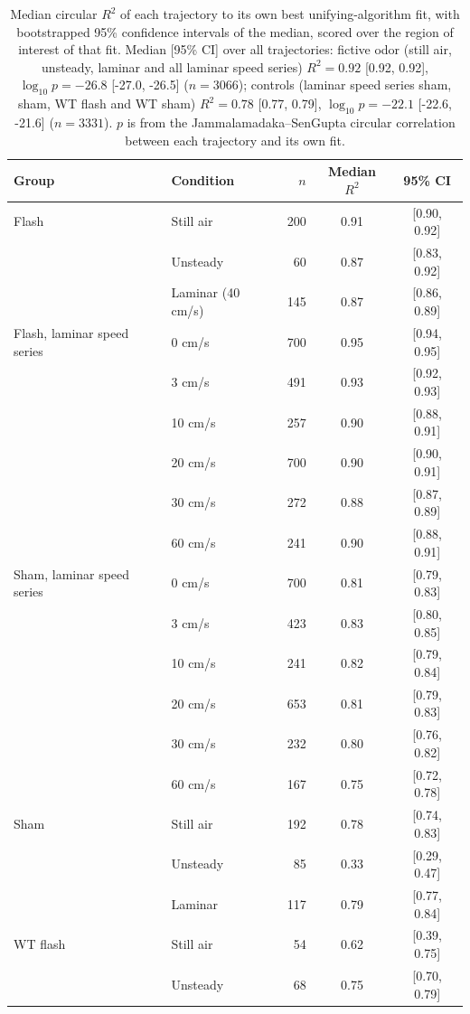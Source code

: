 \begin{table}[ht]
\centering
\caption{Median circular $R^2$ of each trajectory to its own best unifying-algorithm fit, with bootstrapped 95\% confidence intervals of the median, scored over the region of interest of that fit. Median [95\% CI] over all trajectories: fictive odor (still air, unsteady, laminar and all laminar speed series) $R^2 = 0.92$ [0.92, 0.92], $\log_{10} p = -26.8$ [-27.0, -26.5] ($n = 3066$); controls (laminar speed series sham, sham, WT flash and WT sham) $R^2 = 0.78$ [0.77, 0.79], $\log_{10} p = -22.1$ [-22.6, -21.6] ($n = 3331$). $p$ is from the Jammalamadaka--SenGupta circular correlation between each trajectory and its own fit.}
\label{tab:own_fit_r2}
\begin{tabular}{llrcc}
\hline
Group & Condition & $n$ & Median $R^2$ & 95\% CI \\
\hline
Flash & Still air & 200 & 0.91 & [0.90, 0.92] \\
 & Unsteady & 60 & 0.87 & [0.83, 0.92] \\
 & Laminar (40 cm/s) & 145 & 0.87 & [0.86, 0.89] \\
\hline
Flash, laminar speed series & 0 cm/s & 700 & 0.95 & [0.94, 0.95] \\
 & 3 cm/s & 491 & 0.93 & [0.92, 0.93] \\
 & 10 cm/s & 257 & 0.90 & [0.88, 0.91] \\
 & 20 cm/s & 700 & 0.90 & [0.90, 0.91] \\
 & 30 cm/s & 272 & 0.88 & [0.87, 0.89] \\
 & 60 cm/s & 241 & 0.90 & [0.88, 0.91] \\
\hline
Sham, laminar speed series & 0 cm/s & 700 & 0.81 & [0.79, 0.83] \\
 & 3 cm/s & 423 & 0.83 & [0.80, 0.85] \\
 & 10 cm/s & 241 & 0.82 & [0.79, 0.84] \\
 & 20 cm/s & 653 & 0.81 & [0.79, 0.83] \\
 & 30 cm/s & 232 & 0.80 & [0.76, 0.82] \\
 & 60 cm/s & 167 & 0.75 & [0.72, 0.78] \\
\hline
Sham & Still air & 192 & 0.78 & [0.74, 0.83] \\
 & Unsteady & 85 & 0.33 & [0.29, 0.47] \\
 & Laminar & 117 & 0.79 & [0.77, 0.84] \\
\hline
WT flash & Still air & 54 & 0.62 & [0.39, 0.75] \\
 & Unsteady & 68 & 0.75 & [0.70, 0.79] \\

\end{tabular}
\end{table}
